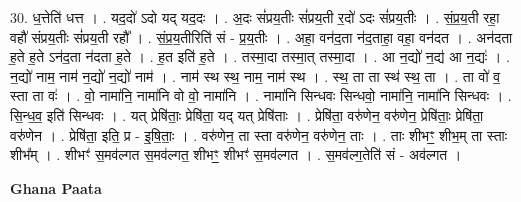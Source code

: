 \documentclass[17pt]{extarticle}
\begin{document}
30. ध॒त्तेति॑ धत्त । . यद॒दो॑ ऽदो यद् यद॒दः । . अ॒दः सं॑प्रय॒तीः सं॑प्रय॒ती र॒दो॑ ऽदः सं॑प्रय॒तीः । . सं॒प्र॒य॒ती रहा॒ वहौ॑ संप्रय॒तीः सं॑प्रय॒ती रहौ᳚ । . सं॒प्र॒य॒तीरिति॑ सं - प्र॒य॒तीः । . अहा॒ वन॑द॒ता न॑द॒ताहा॒ वहा॒ वन॑दत । . अन॑दता ह॒ते ह॒ते ऽन॑द॒ता न॑दता ह॒ते । . ह॒त इति॑ ह॒ते । . तस्मा॒दा तस्मा॒त् तस्मा॒दा । . आ न॒द्यो॑ न॒द्य॑ आ न॒द्यः॑ । . न॒द्यो॑ नाम॒ नाम॑ न॒द्यो॑ न॒द्यो॑ नाम॑ । . नाम॑ स्थ स्थ॒ नाम॒ नाम॑ स्थ । . स्थ॒ ता ता स्थ॑ स्थ॒ ता । . ता वो॑ व॒ स्ता ता वः॑ । . वो॒ नामा॑नि॒ नामा॑नि वो वो॒ नामा॑नि । . नामा॑नि सिन्धवः सिन्धवो॒ नामा॑नि॒ नामा॑नि सिन्धवः । . सि॒न्ध॒व॒ इति॑ सिन्धवः । . यत् प्रेषि॑ताः॒ प्रेषि॑ता॒ यद् यत् प्रेषि॑ताः । . प्रेषि॑ता॒ वरु॑णेन॒ वरु॑णेन॒ प्रेषि॑ताः॒ प्रेषि॑ता॒ वरु॑णेन । . प्रेषि॑ता॒ इति॒ प्र - इ॒षि॒ताः॒ । . वरु॑णेन॒ ता स्ता वरु॑णेन॒ वरु॑णेन॒ ताः । . ताः शीभꣳ॒॒ शीभ॒म् ता स्ताः शीभ᳚म् । . शीभꣳ॑ स॒मव॑ल्गत स॒मव॑ल्गत॒ शीभꣳ॒॒ शीभꣳ॑ स॒मव॑ल्गत । . स॒मव॑ल्ग॒तेति॑ सं - अव॑ल्गत । \newline

\textbf{Ghana Paata } \newline
\end{document}
